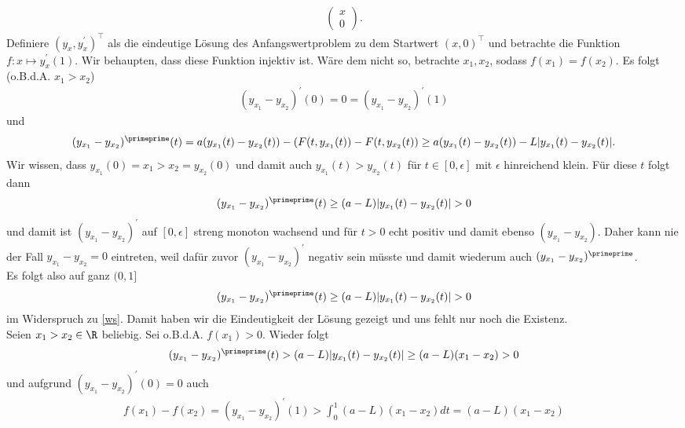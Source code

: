 \begin{solution}
\begin{enumerate}[label = \textbf{\alph*)}]
\begin{align*}
\begin{pmatrix}
      x \\ 0
    \end{pmatrix}.
  \end{align*}
  Definiere $(y_x,y_x^{\prime})^{\top}$ als die eindeutige Lösung des Anfangswertproblem
  zu dem Startwert $(x,0)^{\top}$ und betrachte die Funktion $f: x \mapsto y_x^{\prime}(1)$.
  Wir behaupten, dass diese Funktion injektiv ist. Wäre dem nicht so, betrachte $x_1,x_2$, sodass $f(x_1) = f(x_2)$.
  Es folgt (o.B.d.A. $x_1 > x_2$)
  \begin{align}\label{ws}
    (y_{x_1} - y_{x_2})^{\prime}(0) = 0 = (y_{x_1} - y_{x_2})^{\prime}(1)
  \end{align}
  und
  \begin{align*}
    (y_{x_1} - y_{x_2})^{\primeprime}(t) = a(y_{x_1}(t) - y_{x_2}(t)) - (F(t,y_{x_1}(t)) - F(t,y_{x_2}(t))
    \geq a(y_{x_1}(t) - y_{x_2}(t)) - L|y_{x_1}(t) - y_{x_2}(t)|.
  \end{align*}
  Wir wissen, dass $y_{x_1}(0) = x_1 > x_2 = y_{x_2}(0)$ und damit auch
  $y_{x_1}(t) > y_{x_2}(t)$ für $t \in [0,\epsilon]$ mit $\epsilon$ hinreichend klein. Für diese $t$ folgt dann
  \begin{align*}
    (y_{x_1} - y_{x_2})^{\primeprime}(t) \geq (a-L)|y_{x_1}(t) - y_{x_2}(t)| > 0
  \end{align*}
  und damit ist $(y_{x_1} - y_{x_2})^{\prime}$ auf $[0,\epsilon]$ streng monoton wachsend
  und für $t > 0$ echt positiv und damit ebenso $(y_{x_1} - y_{x_2})$.
  Daher kann nie der Fall $y_{x_1} - y_{x_2} = 0$ eintreten, weil dafür zuvor
  $(y_{x_1} - y_{x_2})^{\prime}$ negativ sein müsste und damit wiederum
  auch $(y_{x_1} - y_{x_2})^{\primeprime}$. \\
  Es folgt also auf ganz $(0,1]$
  \begin{align*}
    (y_{x_1} - y_{x_2})^{\primeprime}(t) \geq (a-L)|y_{x_1}(t) - y_{x_2}(t)| > 0
  \end{align*}
  im Widerspruch zu \eqref{ws}. Damit haben wir die Eindeutigkeit der Lösung gezeigt
  und uns fehlt nur noch die Existenz. \\
  Seien $x_1 > x_2 \in \R$ beliebig. Sei o.B.d.A. $f(x_1) >0$. Wieder folgt
  \begin{align*}
    (y_{x_1} - y_{x_2})^{\primeprime}(t) > (a-L)|y_{x_1}(t) - y_{x_2}(t)| \geq (a-L)(x_1 - x_2) > 0
  \end{align*}
  und aufgrund $(y_{x_1} - y_{x_2})^{\prime}(0) = 0$ auch
  \begin{align*}
    f(x_1) - f(x_2) = (y_{x_1} - y_{x_2})^{\prime}(1) > \int_0^1 (a-L)(x_1 - x_2) dt = (a-L)(x_1 - x_2)

\end{align*}
\end{enumerate}
\end{solution}
